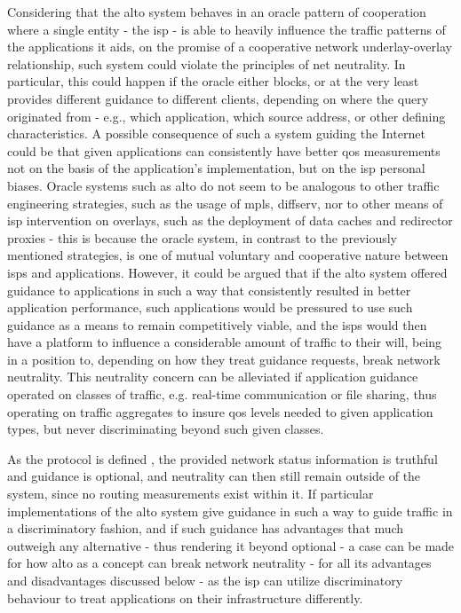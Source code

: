     Considering that the \gls{alto} system behaves in an oracle pattern of cooperation where a single entity - the \gls{isp} - is able to heavily influence the traffic patterns of the applications it aids, on the promise of a cooperative network underlay-overlay relationship, such system could violate the principles of net neutrality.
    In particular, this could happen if the oracle either blocks, or at the very least provides different guidance to different clients, depending on where the query originated from - e.g., which application, which source address, or other defining characteristics.
    A possible consequence of such a system guiding the Internet could be that given applications can consistently have better \gls{qos} measurements not on the basis of the application's implementation, but on the \gls{isp} personal biases.
    Oracle systems such as \gls{alto} do not seem to be analogous to other traffic engineering strategies, such as the usage of \gls{mpls}, \gls{diffserv}, nor to other means of \gls{isp} intervention on overlays, such as the deployment of data caches and redirector proxies - this is because the oracle system, in contrast to the previously mentioned strategies, is one of mutual voluntary and cooperative nature between \glspl{isp} and applications.
    However, it could be argued that if the \gls{alto} system offered guidance to applications in such a way that consistently resulted in better application performance, such applications would be pressured to use such guidance as a means to remain competitively viable, and the \glspl{isp} would then have a platform to influence a considerable amount of traffic to their will, being in a position to, depending on how they treat guidance requests, break network neutrality.
    This neutrality concern can be alleviated if application guidance operated on classes of traffic, e.g. real-time communication or file sharing, thus operating on traffic aggregates to insure \gls{qos} levels needed to given application types, but never discriminating beyond such given classes.

    As the protocol is defined \cite{alto-protocol}, the provided network status information is truthful and guidance is optional, and neutrality can then still remain outside of the system, since no routing measurements exist within it.
    If particular implementations of the \gls{alto} system give guidance in such a way to guide traffic in a discriminatory fashion, and if such guidance has advantages that much outweigh any alternative - thus rendering it beyond optional - a case can be made for how \gls{alto} as a concept can break network neutrality - for all its advantages and disadvantages discussed below - as the \gls{isp} can utilize discriminatory behaviour to treat applications on their infrastructure differently.

